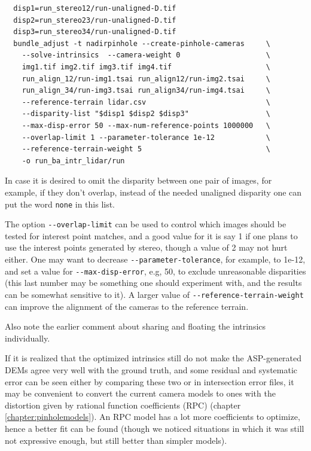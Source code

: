 \begin{verbatim}
  disp1=run_stereo12/run-unaligned-D.tif
  disp2=run_stereo23/run-unaligned-D.tif
  disp3=run_stereo34/run-unaligned-D.tif
  bundle_adjust -t nadirpinhole --create-pinhole-cameras     \
    --solve-intrinsics  --camera-weight 0                    \
    img1.tif img2.tif img3.tif img4.tif                      \
    run_align_12/run-img1.tsai run_align12/run-img2.tsai     \
    run_align_34/run-img3.tsai run_align34/run-img4.tsai     \
    --reference-terrain lidar.csv                            \
    --disparity-list "$disp1 $disp2 $disp3"                  \
    --max-disp-error 50 --max-num-reference-points 1000000   \
    --overlap-limit 1 --parameter-tolerance 1e-12            \
    --reference-terrain-weight 5                             \   
    -o run_ba_intr_lidar/run
\end{verbatim}
In case it is desired to omit the disparity between one pair
of images, for example, if they don't overlap, instead of
the needed unaligned disparity one can put the word \texttt{none} in this list.

The option \texttt{-\/-overlap-limit} can be used to control which images should be
tested for interest point matches, and a good value for it is say 1 if
one plans to use the interest points generated by stereo, though a value
of 2 may not hurt either. One may want to decrease
\texttt{-\/-parameter-tolerance}, for example, to 1e-12, and set a value
for \texttt{-\/-max-disp-error}, e.g, 50, to exclude unreasonable
disparities (this last number may be something one should experiment with,
and the results can be somewhat sensitive to it). A larger value of 
\texttt{-\/-reference-terrain-weight} can improve the alignment
of the cameras to the reference terrain.

Also note the earlier comment about sharing and floating the intrinsics individually. 

If it is realized that the optimized intrinsics still do not make the ASP-generated
DEMs agree very well with the ground truth, and some residual and systematic error can be seen
either by comparing these two or in intersection error files, it may be convenient
to convert the current camera models to ones with the distortion given by rational function
coefficients (RPC) (chapter \ref{chapter:pinholemodels}). An RPC model has a lot more
coefficients to optimize, hence a better fit can be found (though we noticed situations 
in which it was still not expressive enough, but still better than simpler models). 

